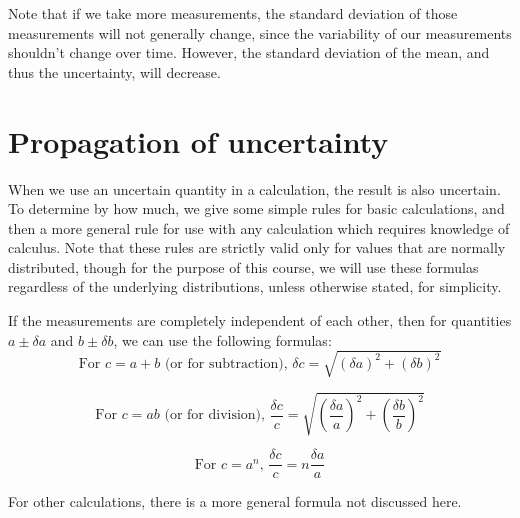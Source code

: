 Note that if we take more measurements, the standard deviation of those measurements will not generally change, since the variability of our measurements shouldn't change over time. However, the standard deviation of the mean, and thus the uncertainty, will decrease.

\section{Propagation of uncertainty}\label{unc:sec:prop}

When we use an uncertain quantity in a calculation, the result is also uncertain. To determine by how much, we give some simple rules for basic calculations, and then a more general rule for use with any calculation which requires knowledge of calculus. Note that these rules are strictly valid only for values that are normally distributed, though for the purpose of this course, we will use these formulas regardless of the underlying distributions, unless otherwise stated, for simplicity.

If the measurements are completely independent of each other, then for quantities $a \pm \delta a$ and $b \pm \delta b$, we can use the following formulas:
\begin{equation}\label{unc:add}
\textrm{For } c = a + b \textrm{ (or for subtraction), } \delta c = \sqrt{(\delta a)^2 + (\delta b)^2}
\end{equation}

\begin{equation}\label{unc:mult}
\textrm{For } c = ab \textrm{ (or for division), } \frac{\delta c}{c} = \sqrt{\left(\frac{\delta a}{a}\right)^2 + \left(\frac{\delta b}{b}\right)^2}
\end{equation}

\begin{equation}\label{unc:exp}
\textrm{For } c = a^n,\, \frac{\delta c}{c} = n \frac{\delta a}{a}
\end{equation}

For other calculations, there is a more general formula not discussed here.


